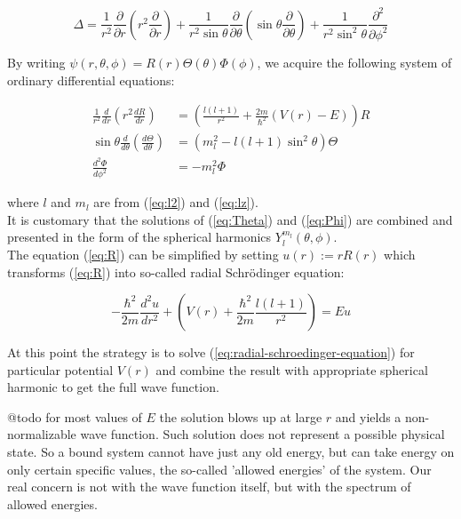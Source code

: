 \documentclass[11pt, a4paper, german]{article}
\theoremstyle{plain}
\theoremstyle{definition}
\theoremstyle{remark}
\numberwithin{equation}{section}
\numberwithin{theorem}{section}
\begin{document}
$$ \Delta = \frac{1}{r^2} \frac{\partial}{\partial r}\left(r^2 \frac{\partial}{\partial r}\right) + \frac{1}{r^2 \sin \theta} \frac{\partial}{\partial \theta} \left( \sin \theta \frac{\partial}{\partial \theta}\right) + \frac{1}{r^2 \sin^2 \theta}\frac{\partial ^2}{\partial \phi ^2}$$

By writing $\psi(r, \theta, \phi) = R(r)\Theta(\theta)\Phi(\phi)$, we acquire the following system of ordinary differential equations:

\begin{align} 
\frac{1}{r^2}\frac{d}{dr}\left(r^2 \frac{dR}{dr}\right) &= \left(\frac{l(l+1)}{r^2} + \frac{2m}{\hbar^2}(V(r)-E)\right) R \label{eq:R}\\
\sin \theta \frac{d}{d\theta}\left( \frac{d\Theta}{d \theta}\right) &= \left( m_l^2 - l(l+1)\sin^2\theta\right)\Theta \label{eq:Theta} \\
\frac{d^2\Phi}{d\phi^2} &= -m_l^2\Phi \label{eq:Phi}
\end{align}

where $l$ and $m_l$ are from (\ref{eq:l2}) and (\ref{eq:lz}).\\

It is customary that the solutions of (\ref{eq:Theta}) and (\ref{eq:Phi}) are combined and presented in the form of the spherical harmonics $Y^{m_l}_l(\theta, \phi)$. \\

The equation (\ref{eq:R}) can be simplified by setting $u(r) := r R(r)$ which transforms (\ref{eq:R}) into so-called radial Schrödinger equation:

\begin{equation} \label{eq:radial-schroedinger-equation}
-\frac{\hbar^2}{2m}\frac{d^2u}{dr^2}+\left(V(r)+\frac{\hbar^2}{2m}\frac{l(l+1)}{r^2}\right) = Eu
\end{equation}

At this point the strategy is to solve (\ref{eq:radial-schroedinger-equation}) for particular potential $V(r)$ and combine the result with appropriate spherical harmonic to get the full wave function.

@todo for most values of $E$ the solution blows up at large $r$ and yields a non-normalizable wave function. Such solution does not represent a possible physical state. So a bound system cannot have just any old energy, but can take energy on only certain specific values, the so-called 'allowed energies' of the system. Our real concern is not with the wave function itself, but with the spectrum of allowed energies.\\
\end{document}
